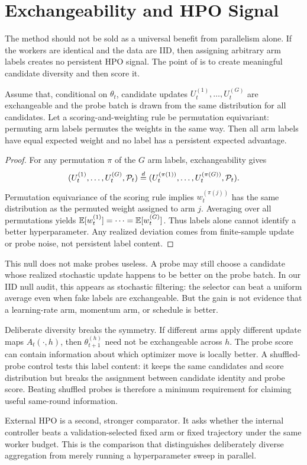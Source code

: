 \section{Exchangeability and HPO Signal}
\label{sec:analysis}

The method should not be sold as a universal benefit from parallelism alone.
If the workers are identical and the data are IID, then assigning arbitrary arm
labels creates no persistent HPO signal. The point of \method is to create
meaningful candidate diversity and then score it.

\begin{proposition}
\label{prop:exchangeable}
Assume that, conditional on $\theta_t$, candidate updates
$U_t^{(1)},\ldots,U_t^{(G)}$ are exchangeable and the probe batch is drawn from
the same distribution for all candidates. Let a scoring-and-weighting rule be
permutation equivariant: permuting arm labels permutes the weights in the same
way. Then all arm labels have equal expected weight and no label has a
persistent expected advantage.
\end{proposition}

\begin{proof}
For any permutation $\pi$ of the $G$ arm labels, exchangeability gives
\[
(U_t^{(1)},\ldots,U_t^{(G)},\mathcal{P}_t)
\overset{d}{=}
(U_t^{(\pi(1))},\ldots,U_t^{(\pi(G))},\mathcal{P}_t).
\]
Permutation equivariance of the scoring rule implies
$w_t^{(\pi(j))}$ has the same distribution as the permuted weight assigned to
arm $j$. Averaging over all permutations yields
$\mathbb{E}[w_t^{(1)}]=\cdots=\mathbb{E}[w_t^{(G)}]$. Thus labels alone cannot identify a
better hyperparameter. Any realized deviation comes from finite-sample update
or probe noise, not persistent label content.
\end{proof}

This null does not make probes useless. A probe may still choose a candidate
whose realized stochastic update happens to be better on the probe batch. In
our IID null audit, this appears as stochastic filtering: the selector can beat
a uniform average even when fake labels are exchangeable. But the gain is not
evidence that a learning-rate arm, momentum arm, or schedule is better.

Deliberate diversity breaks the symmetry. If different arms apply different
update maps $A_t(\cdot,h)$, then $\theta_{t+1}^{(h)}$ need not be exchangeable
across $h$. The probe score can contain information about which optimizer move
is locally better. A shuffled-probe control tests this label content: it keeps
the same candidates and score distribution but breaks the assignment between
candidate identity and probe score. Beating shuffled probes is therefore a
minimum requirement for claiming useful same-round information.

External HPO is a second, stronger comparator. It asks whether the internal
controller beats a validation-selected fixed arm or fixed trajectory under the
same worker budget. This is the comparison that distinguishes deliberately
diverse aggregation from merely running a hyperparameter sweep in parallel.

